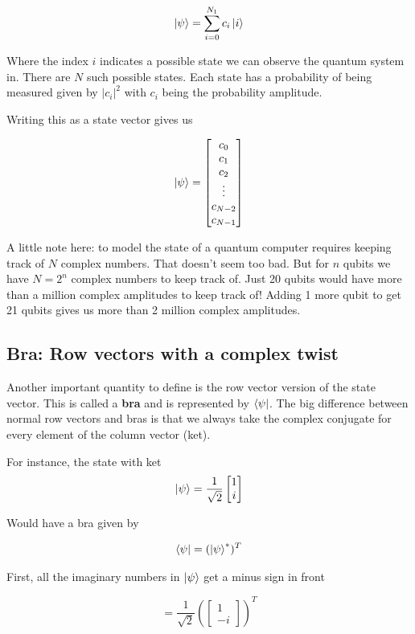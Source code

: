 \documentclass{book}
\begin{document}
$$
\ket{\psi} = \sum_{i = 0}^{N_1} c_i \ket{i}
$$


Where the index $i$ indicates a possible state we can observe the quantum system in. There are $N$ such possible states. Each state has a probability of being measured given by $|c_i|^2$  with $c_i$ being the probability amplitude. 

Writing this as a state vector gives us 

$$
\ket{\psi} = \begin{bmatrix} c_0 \\ c_1 \\ c_2 \\ \vdots \\ c_{N-2} \\ c_{N-1} \end{bmatrix}
$$

A little note here: to model the state of a quantum computer requires keeping track of $N$ complex numbers. That doesn't seem too bad.  But for $n$ qubits we have $N = 2^n$ complex numbers to keep track of. Just 20 qubits would have more than a million complex amplitudes to keep track of! Adding 1 more qubit to get 21 qubits gives us more than 2 million complex amplitudes. 


\subsection{ Bra: Row vectors with a complex twist }


Another important quantity to define is the row vector version of the state vector. This is called a \textbf{bra} and is represented by $\bra{\psi}$. The big difference between normal row vectors and bras is that we always take the complex conjugate for every element of the column vector (ket). 

For instance, the state with ket
$$\ket{\psi} = \frac{1}{\sqrt{2}} \begin{bmatrix} 1 \\ i \end{bmatrix} $$

Would have a bra given by 

$$
\bra{\psi} = (\ket{\psi}^*)^T 
$$

First, all the imaginary numbers in $\ket{\psi}$ get a minus sign in front 

 $$= \frac{1}{\sqrt{2}} \left(\begin{bmatrix} 1 \\ -i \end{bmatrix} \right)^T $$
\end{document}
